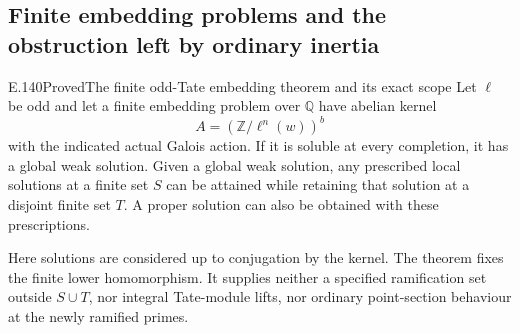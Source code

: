 \subsection{Finite embedding problems and the obstruction left by ordinary inertia}

\begin{result}{E.140}{Proved}{The finite odd-Tate embedding theorem and its exact scope}
Let \(\ell\) be odd and let a finite embedding problem over
\(\mathbb Q\) have abelian kernel
\[
                    A=(\mathbb Z/\ell^n(w))^b
\]
with the indicated actual Galois action. If it is soluble
at every completion, it has a global weak solution.
Given a global weak solution, any prescribed local solutions
at a finite set \(S\) can be attained while retaining that
solution at a disjoint finite set \(T\). A proper solution
can also be obtained with these prescriptions.

Here solutions are considered up to conjugation by the
kernel. The theorem fixes the finite lower homomorphism.
It supplies neither a specified ramification set outside
\(S\cup T\), nor integral Tate-module lifts, nor ordinary
point-section behaviour at the newly ramified primes.
\end{result}
